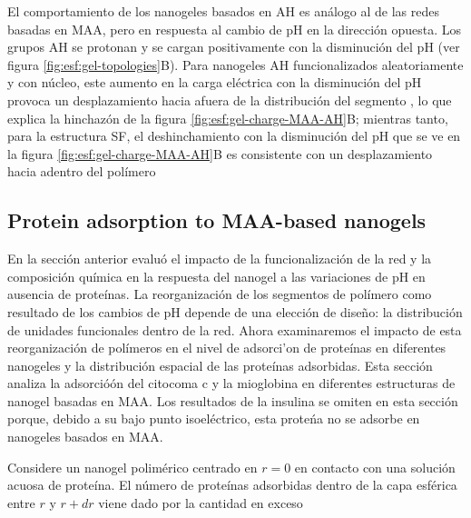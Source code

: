 El comportamiento de los nanogeles basados en AH es an\'alogo al de las redes basadas en MAA, pero en respuesta al cambio de pH en la direcci\'on opuesta.
Los grupos AH se protonan y se cargan positivamente con la disminuci\'on del pH (ver figura \ref{fig:esf:gel-topologies}B).
Para nanogeles AH funcionalizados aleatoriamente y con n\'ucleo, este aumento en la carga el\'ectrica con la disminución del pH provoca un desplazamiento hacia afuera de la distribuci\'on del segmento %
, lo que explica la hinchaz\'on de la figura \ref{fig:esf:gel-charge-MAA-AH}B;
mientras tanto, para la estructura SF, el deshinchamiento con la disminuci\'on del pH que se ve en la figura \ref{fig:esf:gel-charge-MAA-AH}B es consistente con un desplazamiento hacia adentro del pol\'imero %





\subsection{Protein adsorption to MAA-based nanogels}\label{sec:MAA-NGs}




En la secci\'on anterior evalu\'o el impacto de la funcionalizaci\'on de la red y la composici\'on qu\'imica en la respuesta del nanogel a las variaciones de pH en ausencia de prote\'inas.
La reorganizaci\'on de los segmentos de pol\'imero como resultado de los cambios de pH depende de una elecci\'on de dise\~no: la distribuci\'on de unidades funcionales dentro de la red.
Ahora examinaremos el impacto de esta reorganizaci\'on de pol\'imeros en el nivel de adsorci'on de prote\'inas en diferentes nanogeles y la distribuci\'on espacial de las prote\'inas adsorbidas.
Esta secci\'on analiza la adsorció\'on del citocoma c y la mioglobina en diferentes estructuras de nanogel basadas en MAA.
Los resultados de la insulina se omiten en esta secci\'on porque, debido a su bajo punto isoel\'ectrico, esta prote\'na no se adsorbe en nanogeles basados en MAA. %

Considere un nanogel polim\'erico centrado en $r=0$ en contacto con una soluci\'on acuosa de prote\'ina.
El n\'umero de prote\'inas adsorbidas dentro de la capa esf\'erica entre $r$ y $r+dr$ viene dado por la cantidad en exceso

